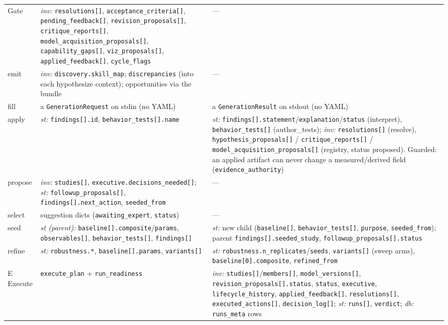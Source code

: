 \documentclass[11pt]{article}
\newcommand{\code}[1]{\texttt{\small #1}}
\begin{document}
\begin{center}
\begin{tabularx}{\textwidth}{@{}>{\raggedright\arraybackslash}p{} Y Y@{}}
\addlinespace[2pt]
Gate & \textit{inv:} \code{resolutions[]}, \code{acceptance\_criteria[]}, \code{pending\_feedback[]}, \code{revision\_proposals[]}, \code{critique\_reports[]}, \code{model\_acquisition\_proposals[]}, \code{capability\_gaps[]}, \code{viz\_proposals[]}, \code{applied\_feedback[]}, \code{cycle\_flags} & ---\\
\addlinespace[2pt]
emit & \textit{inv:} \code{discovery.skill\_map}; \code{discrepancies} (into each hypothesize context); opportunities via the bundle & ---\\
\addlinespace[2pt]
fill & a \code{GenerationRequest} on stdin (no YAML) & a \code{GenerationResult} on stdout (no YAML)\\
\addlinespace[2pt]
apply & \textit{st:} \code{findings[].id}, \code{behavior\_tests[].name} & \textit{st:} \code{findings[].statement}/\code{explanation}/\code{status} (interpret), \code{behavior\_tests[]} (author\_tests); \textit{inv:} \code{resolutions[]} (resolve), \code{hypothesis\_proposals[]} / \code{critique\_reports[]} / \code{model\_acquisition\_proposals[]} (registry, status proposed). Guarded: an applied artifact can never change a measured/derived field (\code{evidence\_authority})\\
\addlinespace[2pt]
propose & \textit{inv:} \code{studies[]}, \code{executive.decisions\_needed[]}; \textit{st:} \code{followup\_proposals[]}, \code{findings[].next\_action}, \code{seeded\_from} & ---\\
\addlinespace[2pt]
select & suggestion dicts (\code{awaiting\_expert}, \code{status}) & ---\\
\addlinespace[2pt]
seed & \textit{st (parent):} \code{baseline[].composite}/\code{params}, \code{observables[]}, \code{behavior\_tests[]}, \code{findings[]} & \textit{st:} new child (\code{baseline[]}, \code{behavior\_tests[]}, \code{purpose}, \code{seeded\_from}); parent \code{findings[].seeded\_study}, \code{followup\_proposals[].status}\\
\addlinespace[2pt]
refine & \textit{st:} \code{robustness.*}, \code{baseline[].params}, \code{variants[]} & \textit{st:} \code{robustness.n\_replicates}/\code{seeds}, \code{variants[]} (sweep arms), \code{baseline[0].composite}, \code{refined\_from}\\
\addlinespace[2pt]
E Execute & \code{execute\_plan} + \code{run\_readiness} & \textit{inv:} \code{studies[]}/\code{members[]}, \code{model\_versions[]}, \code{revision\_proposals[].status}, \code{status}, \code{executive}, \code{lifecycle\_history}, \code{applied\_feedback[]}, \code{resolutions[]}, \code{executed\_actions[]}, \code{decision\_log[]}; \textit{st:} \code{runs[]}, \code{verdict}; \textit{db:} \code{runs\_meta} rows\\

\end{tabularx}
\end{center}
\end{document}
